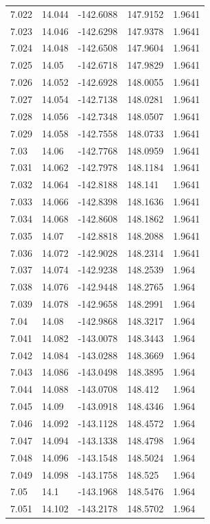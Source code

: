 \begin{tabular}{lllll}
7.022 & 14.044 & -142.6088 & 147.9152 & 1.9641 \\
7.023 & 14.046 & -142.6298 & 147.9378 & 1.9641 \\
7.024 & 14.048 & -142.6508 & 147.9604 & 1.9641 \\
7.025 & 14.05 & -142.6718 & 147.9829 & 1.9641 \\
7.026 & 14.052 & -142.6928 & 148.0055 & 1.9641 \\
7.027 & 14.054 & -142.7138 & 148.0281 & 1.9641 \\
7.028 & 14.056 & -142.7348 & 148.0507 & 1.9641 \\
7.029 & 14.058 & -142.7558 & 148.0733 & 1.9641 \\
7.03 & 14.06 & -142.7768 & 148.0959 & 1.9641 \\
7.031 & 14.062 & -142.7978 & 148.1184 & 1.9641 \\
7.032 & 14.064 & -142.8188 & 148.141 & 1.9641 \\
7.033 & 14.066 & -142.8398 & 148.1636 & 1.9641 \\
7.034 & 14.068 & -142.8608 & 148.1862 & 1.9641 \\
7.035 & 14.07 & -142.8818 & 148.2088 & 1.9641 \\
7.036 & 14.072 & -142.9028 & 148.2314 & 1.9641 \\
7.037 & 14.074 & -142.9238 & 148.2539 & 1.964 \\
7.038 & 14.076 & -142.9448 & 148.2765 & 1.964 \\
7.039 & 14.078 & -142.9658 & 148.2991 & 1.964 \\
7.04 & 14.08 & -142.9868 & 148.3217 & 1.964 \\
7.041 & 14.082 & -143.0078 & 148.3443 & 1.964 \\
7.042 & 14.084 & -143.0288 & 148.3669 & 1.964 \\
7.043 & 14.086 & -143.0498 & 148.3895 & 1.964 \\
7.044 & 14.088 & -143.0708 & 148.412 & 1.964 \\
7.045 & 14.09 & -143.0918 & 148.4346 & 1.964 \\
7.046 & 14.092 & -143.1128 & 148.4572 & 1.964 \\
7.047 & 14.094 & -143.1338 & 148.4798 & 1.964 \\
7.048 & 14.096 & -143.1548 & 148.5024 & 1.964 \\
7.049 & 14.098 & -143.1758 & 148.525 & 1.964 \\
7.05 & 14.1 & -143.1968 & 148.5476 & 1.964 \\
7.051 & 14.102 & -143.2178 & 148.5702 & 1.964 \\

\end{tabular}
